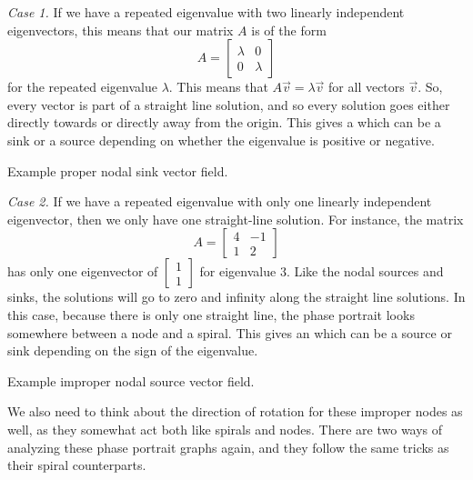 \emph{Case 1.} If we have a repeated eigenvalue with two linearly independent eigenvectors, this means that our matrix $A$ is of the form
\[ A = \begin{bmatrix} \lambda & 0 \\ 0 & \lambda \end{bmatrix} \] for the repeated eigenvalue $\lambda$. This means that $A \vec{v} = \lambda \vec{v}$ for all vectors $\vec{v}$. So, every vector is part of a straight line solution, and so every solution goes either directly towards or directly away from the origin. This gives a \emph{} which can be a sink or a source depending on whether the eigenvalue is positive or negative. 

\begin{myfig}
\capstart
{}
\caption{Example proper nodal sink vector field.\label{pln:proper-sinkfig}}
\end{myfig}

\emph{Case 2.} If we have a repeated eigenvalue with only one linearly independent eigenvector, then we only have one straight-line solution. For instance, the matrix 
\[ A = \begin{bmatrix} 4 & -1 \\ 1 & 2 \end{bmatrix} \] has only one eigenvector of $\begin{bmatrix} 1 \\ 1 \end{bmatrix}$ for eigenvalue $3$. Like the nodal sources and sinks, the solutions will go to zero and infinity along the straight line solutions. In this case, because there is only one straight line, the phase portrait looks somewhere between a node and a spiral. This gives an \emph{} which can be a source or sink depending on the sign of the eigenvalue.

\begin{myfig}
\capstart
{}
\caption{Example improper nodal source vector field.\label{pln:improper-sourcefig}}
\end{myfig}

We also need to think about the direction of rotation for these improper nodes as well, as they somewhat act both like spirals and nodes. There are two ways of analyzing these phase portrait graphs again, and they follow the same tricks as their spiral counterparts. 

